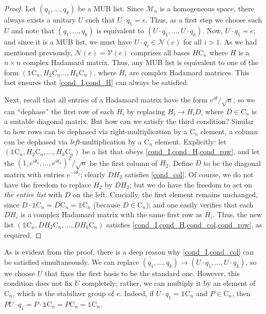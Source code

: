 \documentclass[referee,sn-mathphys-num]{sn-jnl}%
\theoremstyle{thmstyleone}%
\theoremstyle{thmstyletwo}%
\theoremstyle{remark}
\theoremstyle{thmstylethree}%
\begin{document}
\begin{proof}
	Let $ \left( q_1, \ldots, q_k \right) $ be a MUB list. Since $ \mathcal{M}_n $ is a homogeneous space, there always exists a unitary $U$ such that $U \cdot q_1 = e$. Thus, as a first step we choose such $U$ and note that $ \left( q_1, \ldots, q_k \right) $ is equivalent to $ \left( U \cdot q_1, \ldots, U \cdot q_k \right) $. Now, $ U \cdot q_1 = e $; and since it is a MUB list, we must have $ U \cdot q_i \in \mathcal{N} \left( e \right) $ for all $i>1$. As we had mentioned previously, $ \mathcal{N} \left( e \right) = \mathcal{V} \left( e \right) $ comprises all bases $H \mathrm{C}_n$ where $H$ is a $n \times n$ complex Hadamard matrix. Thus, any MUB list is equivalent to one of the form $ \left( \mathds{1} \mathrm{C}_n, H_2 \mathrm{C}_n \ldots, H_k \mathrm{C}_n \right) $, where $H_i$ are complex Hadamard matrices. This fact ensures that \cref{cond_I,cond_H} can always be satisfied.
	
	Next, recall that all entries of a Hadamard matrix have the form $e^{i \theta}/\sqrt{n}$; so we can ``dephase'' the first row of each $H_i$ by replacing $H_i \rightarrow H_i D$, where $D \in \mathrm{C}_n$ is a suitable diagonal matrix. But how can we satisfy the third condition? Similar to how rows can be dephased via right-multiplication by a $\mathrm{C}_n$ element, a column can be dephased via \textit{left}-multiplication by a $\mathrm{C}_n$ element. Explicitly: let $ \left( \mathds{1} \mathrm{C}_n, H_2 \mathrm{C}_n, \ldots, H_k \mathrm{C}_n \right) $ be a list that obeys \cref{cond_I,cond_H,cond_row}, and let the $ \left( 1, e^{i \theta_2}, \ldots, e^{i \theta_n} \right)^T / \sqrt{n} $ be the first column of $H_2$. Define $D$ to be the diagonal matrix with entries $ e^{-i \theta_j} $; clearly $D H_2$ satisfies \cref{cond_col}. Of course, we do not have the freedom to replace $H_2$ by $ D H_2 $; but we do have the freedom to act on \textit{the entire list} with $D$ on the left. 
	Crucially, the first element remains unchanged, since $ D \cdot \mathds{1} \mathrm{C}_n = D \mathrm{C}_n = \mathds{1} \mathrm{C}_n $ (because $D \in \mathrm{C}_n$); and one easily verifies that each $D H_i$ is a complex Hadamard matrix with the same first row as $H_i$. Thus, the new list $ \left( \mathds{1} \mathrm{C}_n, D H_2 \mathrm{C}_n, \ldots, D H_k \mathrm{C}_n \right) $ satisfies \cref{cond_I,cond_H,cond_col,cond_row}, as required.
\end{proof}
As is evident from the proof, there is a deep reason why \cref{cond_I,cond_col} can be satisfied simultaneously. We can replace $ \left( q_1, \ldots, q_k \right) \rightarrow \left( U \cdot q_1, \ldots, U \cdot q_k \right) $, so we choose $U$ that fixes the first basis to be the standard one. However, this condition does not fix $U$ completely; rather, we can multiply it by an element of $ \mathrm{C}_n $, which is the stabilizer group of $e$. Indeed, if $U \cdot q_1 = \mathds{1} \mathrm{C}_n$ and $P \in \mathrm{C}_n$, then $ PU \cdot q_1 = P \cdot \mathds{1} \mathrm{C}_n = P \mathrm{C}_n = \mathds{1} \mathrm{C}_n $.
\end{document}

